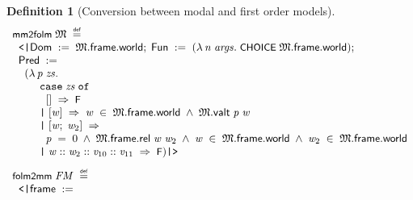 \documentclass[letterpaper]{article}
\newtheorem{defn}{Definition}
\renewcommand{\HOLConst}[1]{{\textsf{\upshape\small #1}}}
\renewcommand{\HOLKeyword}[1]{\texttt{#1}}
\newenvironment{holmath}{\begin{displaymath}\begin{array}{l}}{\end{array}\end{displaymath}\ignorespacesafterend}
\begin{document}
\begin{defn}[Conversion between modal and first order models]
\begin{holmath}
  \HOLConst{mm2folm}\;\HOLFreeVar{\ensuremath{\mathfrak{M}}}\;\HOLSymConst{\HOLTokenDefEquality{}}\\
\;\;\HOLTokenLeftrec{}\HOLFieldName{Dom}\;:=\;\HOLFreeVar{\ensuremath{\mathfrak{M}}}.\HOLFieldName{frame}.\HOLFieldName{world};\;\HOLFieldName{Fun}\;:=\;(\HOLTokenLambda{}\HOLBoundVar{n}\;\HOLBoundVar{args}.\;\HOLConst{CHOICE}\;\HOLFreeVar{\ensuremath{\mathfrak{M}}}.\HOLFieldName{frame}.\HOLFieldName{world});\\
\;\;\HOLFieldName{Pred}\;:=\\
\;\;\;\;(\HOLTokenLambda{}\HOLBoundVar{p}\;\HOLBoundVar{zs}.\\
\;\;\;\;\;\;\;\;\;\HOLKeyword{case}\;\HOLBoundVar{zs}\;\HOLKeyword{of}\\
\;\;\;\;\;\;\;\;\;\;\;[]\;\HOLTokenImp{}\;\HOLConst{F}\\
\;\;\;\;\;\;\;\;\;\HOLTokenBar{}\;[\HOLBoundVar{w}]\;\HOLTokenImp{}\;\HOLBoundVar{w}\;\HOLSymConst{\HOLTokenIn{}}\;\HOLFreeVar{\ensuremath{\mathfrak{M}}}.\HOLFieldName{frame}.\HOLFieldName{world}\;\HOLSymConst{\HOLTokenConj{}}\;\HOLFreeVar{\ensuremath{\mathfrak{M}}}.\HOLFieldName{valt}\;\HOLBoundVar{p}\;\HOLBoundVar{w}\\
\;\;\;\;\;\;\;\;\;\HOLTokenBar{}\;[\HOLBoundVar{w};\;\HOLBoundVar{w\sb{\mathrm{2}}}]\;\HOLTokenImp{}\\
\;\;\;\;\;\;\;\;\;\;\;\HOLBoundVar{p}\;\HOLSymConst{=}\;\HOLNumLit{0}\;\HOLSymConst{\HOLTokenConj{}}\;\HOLFreeVar{\ensuremath{\mathfrak{M}}}.\HOLFieldName{frame}.\HOLFieldName{rel}\;\HOLBoundVar{w}\;\HOLBoundVar{w\sb{\mathrm{2}}}\;\HOLSymConst{\HOLTokenConj{}}\;\HOLBoundVar{w}\;\HOLSymConst{\HOLTokenIn{}}\;\HOLFreeVar{\ensuremath{\mathfrak{M}}}.\HOLFieldName{frame}.\HOLFieldName{world}\;\HOLSymConst{\HOLTokenConj{}}\;\HOLBoundVar{w\sb{\mathrm{2}}}\;\HOLSymConst{\HOLTokenIn{}}\;\HOLFreeVar{\ensuremath{\mathfrak{M}}}.\HOLFieldName{frame}.\HOLFieldName{world}\\
\;\;\;\;\;\;\;\;\;\HOLTokenBar{}\;\HOLBoundVar{w}\HOLSymConst{::}\HOLBoundVar{w\sb{\mathrm{2}}}\HOLSymConst{::}\HOLBoundVar{v\sb{\mathrm{10}}}\HOLSymConst{::}\HOLBoundVar{v\sb{\mathrm{11}}}\;\HOLTokenImp{}\;\HOLConst{F})\HOLTokenRightrec{}\\[3mm]
  \HOLConst{folm2mm}\;\HOLFreeVar{FM}\;\HOLSymConst{\HOLTokenDefEquality{}}\\
\;\;\HOLTokenLeftrec{}\HOLFieldName{frame}\;:=\\

\end{holmath}
\end{defn}
\end{document}
